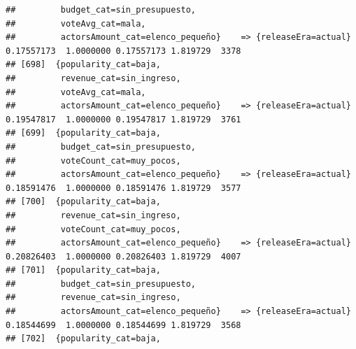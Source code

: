 \documentclass[
]{article}
\begin{document}
\begin{verbatim}
##         budget_cat=sin_presupuesto,                                                                                             
##         voteAvg_cat=mala,                                                                                                       
##         actorsAmount_cat=elenco_pequeño}    => {releaseEra=actual}               0.17557173  1.0000000 0.17557173 1.819729  3378
## [698]  {popularity_cat=baja,                                                                                                    
##         revenue_cat=sin_ingreso,                                                                                                
##         voteAvg_cat=mala,                                                                                                       
##         actorsAmount_cat=elenco_pequeño}    => {releaseEra=actual}               0.19547817  1.0000000 0.19547817 1.819729  3761
## [699]  {popularity_cat=baja,                                                                                                    
##         budget_cat=sin_presupuesto,                                                                                             
##         voteCount_cat=muy_pocos,                                                                                                
##         actorsAmount_cat=elenco_pequeño}    => {releaseEra=actual}               0.18591476  1.0000000 0.18591476 1.819729  3577
## [700]  {popularity_cat=baja,                                                                                                    
##         revenue_cat=sin_ingreso,                                                                                                
##         voteCount_cat=muy_pocos,                                                                                                
##         actorsAmount_cat=elenco_pequeño}    => {releaseEra=actual}               0.20826403  1.0000000 0.20826403 1.819729  4007
## [701]  {popularity_cat=baja,                                                                                                    
##         budget_cat=sin_presupuesto,                                                                                             
##         revenue_cat=sin_ingreso,                                                                                                
##         actorsAmount_cat=elenco_pequeño}    => {releaseEra=actual}               0.18544699  1.0000000 0.18544699 1.819729  3568
## [702]  {popularity_cat=baja,                                                                                                    

\end{verbatim}
\end{document}
